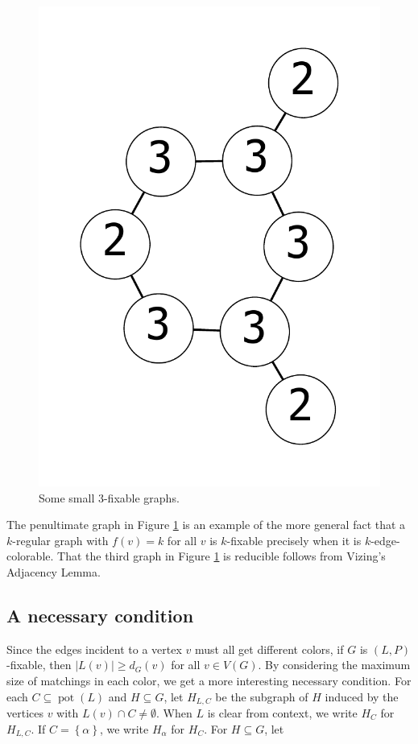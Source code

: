 \documentclass[12pt]{article}
\theoremstyle{plain}
\newtheorem{lem}[thm]{Lemma}
\theoremstyle{definition}
\theoremstyle{remark}
\newcommand{\set}[1]{\left\{ #1 \right\}}
\newcommand{\pot}{\operatorname{pot}}
\begin{document}
\begin{figure}[htb]
     	\includegraphics[scale=0.25]{Delta3TriangleFree/0000110000101000110010001000[3,3,3,2,2,2,3,3].pdf}
		\caption{Some small $3$-fixable graphs.}
		\label{fig:small3}
		\end{figure}

The penultimate graph in Figure \ref{fig:small3} is an example of the more
general fact that a $k$-regular graph with $f(v) = k$ for all $v$ is $k$-fixable
precisely when it is $k$-edge-colorable.  That the third graph in Figure
\ref{fig:small3} is reducible follows from Vizing's Adjacency Lemma.
\subsection{A necessary condition}
Since the edges incident to a vertex $v$ must all get different colors, 
%
if $G$ is $(L, P)$-fixable, then $|L(v)| \ge d_G(v)$ for all $v \in V(G)$.
%
By considering the maximum size of matchings in each color, we get a more
interesting necessary condition.
For each $C \subseteq \pot(L)$ and $H \subseteq G$, let $H_{L, C}$ be the
subgraph of $H$ induced by the vertices $v$ with $L(v) \cap C \ne \emptyset$. 
When $L$ is clear from context, we write $H_C$ for $H_{L,C}$. If $C =
\set{\alpha}$, we write $H_\alpha$ for $H_C$.  For $H \subseteq G$, let
\end{document}
